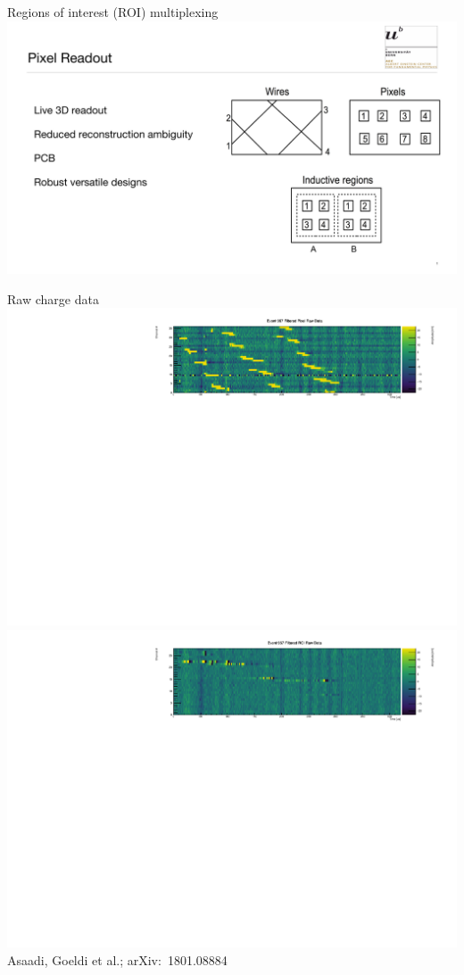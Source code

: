 \documentclass[]{beamer}
\begin{document}
\begin{frame}{Regions of interest (ROI) multiplexing}
	\centering
	\includegraphics[page=2, viewport=20 0 1770 845, clip, width=\textwidth]{defence/Pixels}
\end{frame}

\begin{frame}{Raw charge data}
	\centering
	\includegraphics[width=\textwidth]{defence/event967_rawFilteredPixel}\\
	\includegraphics[width=\textwidth]{defence/event967_rawFilteredROI}\\
	{\tiny Asaadi, Goeldi et al.; arXiv:~1801.08884~\cite{pixel_paper}}
\end{frame}
\end{document}
